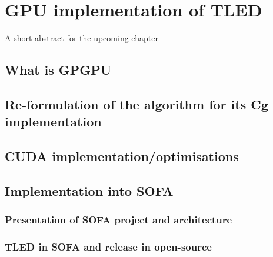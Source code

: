 \chapter{GPU implementation of TLED}
\label{chap6}
\begin{shortAbstract}
A short abstract for the upcoming chapter
\end{shortAbstract}


\section{What is GPGPU}

\section{Re-formulation of the algorithm for its Cg implementation}
		
\section{CUDA implementation/optimisations }
	
\section{Implementation into SOFA}
	\subsection{Presentation of SOFA project and architecture}
	\subsection{TLED in SOFA and release in open-source}